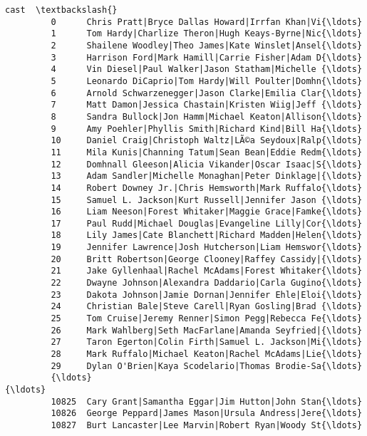 \documentclass[11pt]{article}
\begin{document}
\begin{Verbatim}[commandchars=\\\{\}]
                                                             cast  \textbackslash{}
         0      Chris Pratt|Bryce Dallas Howard|Irrfan Khan|Vi{\ldots}   
         1      Tom Hardy|Charlize Theron|Hugh Keays-Byrne|Nic{\ldots}   
         2      Shailene Woodley|Theo James|Kate Winslet|Ansel{\ldots}   
         3      Harrison Ford|Mark Hamill|Carrie Fisher|Adam D{\ldots}   
         4      Vin Diesel|Paul Walker|Jason Statham|Michelle {\ldots}   
         5      Leonardo DiCaprio|Tom Hardy|Will Poulter|Domhn{\ldots}   
         6      Arnold Schwarzenegger|Jason Clarke|Emilia Clar{\ldots}   
         7      Matt Damon|Jessica Chastain|Kristen Wiig|Jeff {\ldots}   
         8      Sandra Bullock|Jon Hamm|Michael Keaton|Allison{\ldots}   
         9      Amy Poehler|Phyllis Smith|Richard Kind|Bill Ha{\ldots}   
         10     Daniel Craig|Christoph Waltz|LÃ©a Seydoux|Ralp{\ldots}   
         11     Mila Kunis|Channing Tatum|Sean Bean|Eddie Redm{\ldots}   
         12     Domhnall Gleeson|Alicia Vikander|Oscar Isaac|S{\ldots}   
         13     Adam Sandler|Michelle Monaghan|Peter Dinklage|{\ldots}   
         14     Robert Downey Jr.|Chris Hemsworth|Mark Ruffalo{\ldots}   
         15     Samuel L. Jackson|Kurt Russell|Jennifer Jason {\ldots}   
         16     Liam Neeson|Forest Whitaker|Maggie Grace|Famke{\ldots}   
         17     Paul Rudd|Michael Douglas|Evangeline Lilly|Cor{\ldots}   
         18     Lily James|Cate Blanchett|Richard Madden|Helen{\ldots}   
         19     Jennifer Lawrence|Josh Hutcherson|Liam Hemswor{\ldots}   
         20     Britt Robertson|George Clooney|Raffey Cassidy|{\ldots}   
         21     Jake Gyllenhaal|Rachel McAdams|Forest Whitaker{\ldots}   
         22     Dwayne Johnson|Alexandra Daddario|Carla Gugino{\ldots}   
         23     Dakota Johnson|Jamie Dornan|Jennifer Ehle|Eloi{\ldots}   
         24     Christian Bale|Steve Carell|Ryan Gosling|Brad {\ldots}   
         25     Tom Cruise|Jeremy Renner|Simon Pegg|Rebecca Fe{\ldots}   
         26     Mark Wahlberg|Seth MacFarlane|Amanda Seyfried|{\ldots}   
         27     Taron Egerton|Colin Firth|Samuel L. Jackson|Mi{\ldots}   
         28     Mark Ruffalo|Michael Keaton|Rachel McAdams|Lie{\ldots}   
         29     Dylan O'Brien|Kaya Scodelario|Thomas Brodie-Sa{\ldots}   
         {\ldots}                                                  {\ldots}   
         10825  Cary Grant|Samantha Eggar|Jim Hutton|John Stan{\ldots}   
         10826  George Peppard|James Mason|Ursula Andress|Jere{\ldots}   
         10827  Burt Lancaster|Lee Marvin|Robert Ryan|Woody St{\ldots}   

\end{Verbatim}
\end{document}
